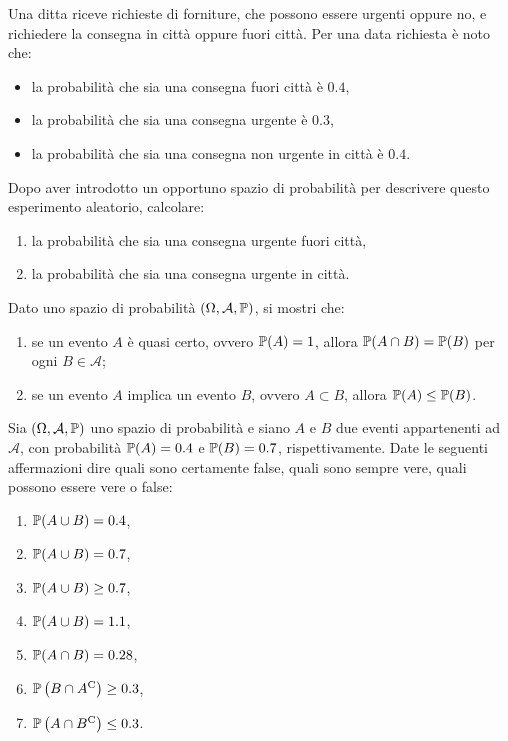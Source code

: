 \Esercizio{}

Una ditta riceve richieste di forniture, che possono essere urgenti oppure no, e richiedere la consegna in città oppure fuori città. Per una data richiesta è noto che:
\begin{itemize}
	\item la probabilità che sia una consegna fuori città è $0.4$,
	\item la probabilità che sia una consegna urgente è $0.3$,
	\item la probabilità che sia una consegna non urgente in città è $0.4$.
\end{itemize}
Dopo aver introdotto un opportuno spazio di probabilità per descrivere questo esperimento aleatorio, calcolare:
\begin{enumerate}
	\item la probabilità che sia una consegna urgente fuori città,
	\item la probabilità che sia una consegna urgente in città.
\end{enumerate}

\Esercizio{}

Dato uno spazio di probabilità $(\Omega ,\mathcal{A} ,\mathbb{P})$, si mostri che:
\begin{enumerate}
	\item se un evento $A$ è quasi certo, ovvero $\mathbb{P}(A) =1$, allora $\mathbb{P}(A\cap B) =\mathbb{P}(B)$ per ogni $B\in \mathcal{A}$;
	\item se un evento $A$ implica un evento $B$, ovvero $A\subset B$, allora $\mathbb{P}(A) \leq \mathbb{P}(B)$.
\end{enumerate}

\Esercizio{}

Sia $(\Omega ,\mathcal{A} ,\mathbb{P})$ uno spazio di probabilità e siano $A$ e $B$ due eventi appartenenti ad $\mathcal{A}$, con probabilità $\mathbb{P}(A) =0.4$ e $\mathbb{P}(B) =0.7$, rispettivamente. Date le seguenti affermazioni dire quali sono certamente false, quali sono sempre vere, quali possono essere vere o false:
\begin{enumerate}
	\item $\mathbb{P}(A\cup B) =0.4$,
	\item $\mathbb{P}(A\cup B) =0.7$,
	\item $\mathbb{P}(A\cup B) \geq 0.7$,
	\item $\mathbb{P}(A\cup B) =1.1$,
	\item $\mathbb{P}(A\cap B) =0.28$,
	\item $\mathbb{P}\left(B\cap A^{\mathrm{C}}\right) \geq 0.3$,
	\item $\mathbb{P}\left(A\cap B^{\mathrm{C}}\right) \leq 0.3$.
\end{enumerate}

